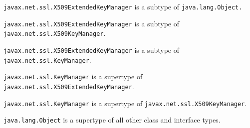 \texttt{javax.net.ssl.X509ExtendedKeyManager} is a subtype of \texttt{java.lang.Object.}

\texttt{javax.net.ssl.X509ExtendedKeyManager} is a subtype of \texttt{javax.net.ssl.X509KeyManager}.

\texttt{javax.net.ssl.X509ExtendedKeyManager} is a subtype of \texttt{javax.net.ssl.KeyManager}.

\texttt{javax.net.ssl.KeyManager} is a supertype of \texttt{javax.net.ssl.X509ExtendedKeyManager}.

\texttt{javax.net.ssl.KeyManager} is a supertype of \texttt{javax.net.ssl.X509KeyManager}.

\texttt{java.lang.Object} is a supertype of all other class and interface types.